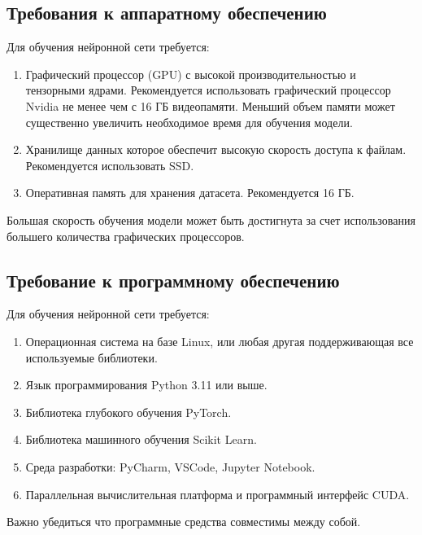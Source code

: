 \documentclass[../part_2.tex]{subfiles}
\begin{document}
\subsection{Требования к аппаратному обеспечению}
\par Для обучения нейронной сети требуется:
\begin{enumerate}
    \item Графический процессор (GPU) с высокой производительностью и тензорными ядрами. Рекомендуется использовать графический процессор Nvidia не менее чем с 16 ГБ видеопамяти. Меньший объем памяти может существенно увеличить необходимое время для обучения модели.
    \item Хранилище данных которое обеспечит высокую скорость доступа к файлам. Рекомендуется использовать SSD.
    \item Оперативная память для хранения датасета. Рекомендуется 16 ГБ.
\end{enumerate}
\par Большая скорость обучения модели может быть достигнута за счет использования большего количества графических процессоров.
\subsection{Требование к программному обеспечению}
\par Для обучения нейронной сети требуется:
\begin{enumerate}
    \item Операционная система на базе Linux, или любая другая поддерживающая все используемые библиотеки.
    \item Язык программирования Python 3.11 или выше.
    \item Библиотека глубокого обучения PyTorch.
    \item Библиотека машинного обучения Scikit Learn.
    \item Среда разработки: PyCharm, VSCode, Jupyter Notebook.
    \item Параллельная вычислительная платформа и программный интерфейс CUDA.
\end{enumerate}
\par Важно убедиться что программные средства совместимы между собой.
\end{document}
